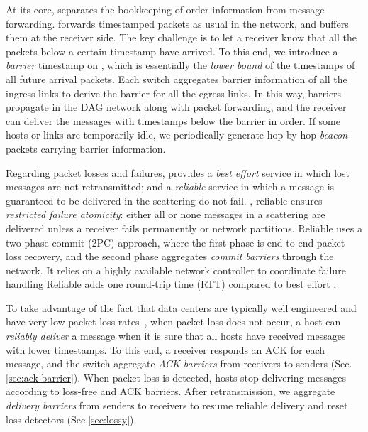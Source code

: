 At its core, \sys separates the bookkeeping of order information from message forwarding.
\sys forwards timestamped packets as usual in the network, and buffers them at the receiver side.
The key challenge is to let a receiver know that all the packets below a certain timestamp have arrived.
To this end, we introduce a \emph{barrier} timestamp on , which is essentially the \emph{lower bound} of the timestamps of all future arrival packets.
Each switch aggregates barrier information of all the ingress links to derive the barrier for all the egress links. In this way, barriers propagate in the DAG  network along with packet forwarding, and the receiver can deliver the messages with timestamps below the barrier in order.
If some hosts or links are temporarily idle, we periodically generate hop-by-hop \emph{beacon} packets carrying barrier information.

Regarding packet losses and failures, \sys{} provides a \emph{best effort} service in which lost messages are not retransmitted; and a \emph{reliable} service in which a message is guaranteed to be delivered  in the scattering do not fail.
, reliable \sys{} ensures \emph{restricted failure atomicity}: either all or none messages in a scattering are delivered unless a receiver fails permanently or network partitions. %
Reliable \sys{} uses a two-phase commit (2PC) approach, where the first phase is end-to-end packet loss recovery, and the second phase aggregates \emph{commit barriers} through the network.
It relies on a highly available network controller to coordinate failure handling
Reliable \sys{} adds one round-trip time (RTT) compared to best effort \sys{}.

\iffalse
To take advantage of the fact that data centers are typically well engineered and have very low packet loss rates~\cite{ports2015designing}, when packet loss does not occur, a host can \emph{reliably deliver} a message when it is sure that all hosts have received messages with lower timestamps.
To this end, a receiver responds an ACK for each message, and the switch aggregate \emph{ACK barriers} from receivers to senders (Sec.\ref{sec:ack-barrier}).
When packet loss is detected, hosts stop delivering messages according to loss-free and ACK barriers.
After retransmission, we aggregate \emph{delivery barriers} from senders to receivers to resume reliable delivery and reset loss detectors (Sec.\ref{sec:lossy}).


